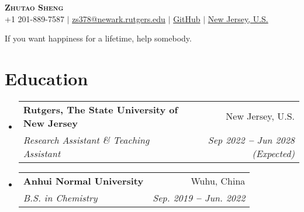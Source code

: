 \documentclass[letterpaper,11pt]{article}
\makeatletter
\newcommand{\resumeSubheading}[4]{
	\vspace{-2pt}\item
	\begin{tabular*}{0.97\textwidth}[t]{l@{\extracolsep{\fill}}r}
		\textbf{#1} & #2 \\
		\textit{\small#3} & \textit{\small #4} \\
	\end{tabular*}\vspace{-7pt}
}
\newcommand{\resumeSubHeadingListStart}{\begin{itemize}[leftmargin=0.15in, label={}]}
\newcommand{\resumeSubHeadingListEnd}{\end{itemize}}
\makeatother
\begin{document}
	
	
	\begin{center}
		\textbf{\Huge \scshape \textbf{\color{red}Zhutao Sheng}} \\ \vspace{3pt}
		\small
		\faMobile \hspace{.5pt} {+1 201-889-7587}
		$|$
		\faAt \hspace{.5pt} \href{mailto:arasgungore09@gmail.com}{zs378@newark.rutgers.edu}
		$|$
		\faGithub \hspace{.5pt} \href{https://github.com/zhutaosheng}{GitHub}
		$|$
		\faMapMarker \hspace{.5pt} \href{https://www.google.com/maps/place/Olson+Hall+-+Chemistry/@40.7409235,-74.1751715,17.38z/data=!4m6!3m5!1s0x89c2537e60739387:0xcc3cf6ac4fa15af4!8m2!3d40.7401976!4d-74.1753061!16s%2Fg%2F11fy965_6r}{New Jersey, U.S.}
	\end{center}
	
	\begin{center}
		\color{red}If you want happiness for a lifetime, help somebody.
	\end{center}
	
	
	\section{\textbf{\color{red}Education}}
	\vspace{3pt}
	\resumeSubHeadingListStart
	
	\resumeSubheading
	{Rutgers, The State University of New Jersey}{New Jersey, U.S.}
	{Research Assistant \& Teaching Assistant}{Sep 2022 \textbf{--} Jun 2028 (Expected)}
	
	
	\resumeSubheading
	{Anhui Normal University }{Wuhu, China}
	{B.S. in Chemistry}{Sep. 2019 \textbf{--} Jun. 2022}
	
	\resumeSubHeadingListEnd
	
	
	
	
	
\end{document}
